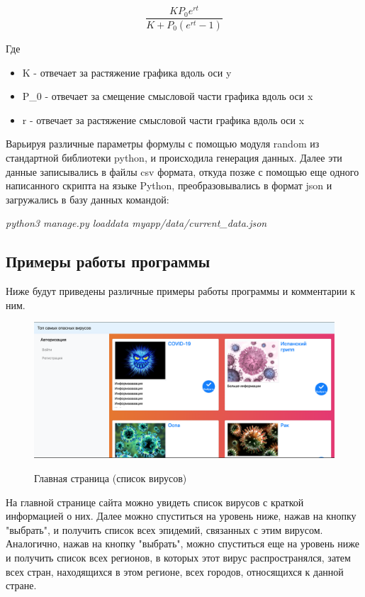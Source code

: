 \documentclass[a4paper,14pt]{extarticle}
\begin{document}
 	\[
 	\frac{K P_0 e^{rt}}{K + P_0 (e^{rt} - 1)}
 	\]
 	
 	Где
 	\begin{itemize}
 		\item K - отвечает за растяжение графика вдоль оси y
 		\item P\_0 - отвечает за смещение смысловой части графика вдоль оси x
 		\item r - отвечает за растяжение смысловой части графика вдоль оси x
 	\end{itemize}
 	
 	Варьируя различные параметры формулы с помощью модуля random из стандартной библиотеки python, и происходила генерация данных. Далее эти данные записывались в файлы csv формата, откуда позже с помощью еще одного написанного скрипта на языке Python, преобразовывались в формат json и загружались в базу данных командой:
 	
 	\textit{python3 manage.py loaddata myapp/data/current\_data.json}
 	
 	\newpage
 	
 	\subsection{Примеры работы программы}
 	
 	Ниже будут приведены различные примеры работы программы и комментарии к ним.
 	
 	\begin{figure}[h!]
 		\begin{center}
 			{\includegraphics[width = \textwidth]{examples/main.png}}
 			\caption{
 				Главная страница (список вирусов)}
 			\label{ris:main}
 		\end{center}
 	\end{figure}
 	
 	На главной странице сайта можно увидеть список вирусов с краткой информацией о них. Далее можно спуститься на уровень ниже, нажав на кнопку "выбрать", и получить список всех эпидемий, связанных с этим вирусом. Аналогично, нажав на кнопку "выбрать", можно спуститься еще на уровень ниже и получить список всех регионов, в которых этот вирус распространялся, затем всех стран, находящихся в этом регионе, всех городов, относящихся к данной стране.
 	
\end{document}
